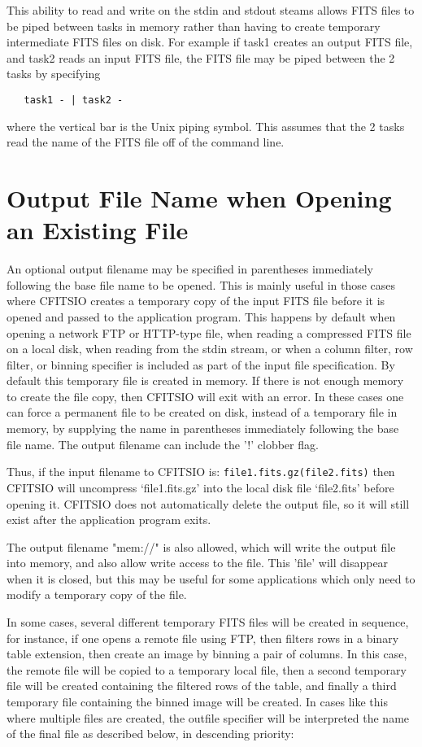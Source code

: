 \documentclass[11pt]{book}
\begin{document}
This ability to read and write on the stdin and stdout steams allows
FITS files to be piped between tasks in memory rather than having to
create temporary intermediate FITS files on disk.  For example if task1
creates an output FITS file, and task2 reads an input FITS file, the
FITS file may be piped between the 2 tasks by specifying

\begin{verbatim}
   task1 - | task2 -
\end{verbatim}
where the vertical bar is the Unix piping symbol.  This assumes that the 2
tasks read the name of the FITS file off of the command line.


\section{Output File Name when Opening an Existing File}

An optional output filename may be specified in parentheses immediately
following the base file name to be opened.  This is mainly useful in
those cases where CFITSIO creates a temporary copy of the input FITS
file before it is opened and passed to the application program.  This
happens by default when opening a network FTP or HTTP-type file, when
reading a compressed FITS file on a local disk, when reading from the
stdin stream, or when a column filter, row filter, or binning specifier
is included as part of the input file specification.  By default this
temporary file is created in memory.  If there is not enough memory to
create the file copy, then CFITSIO will exit with an error.   In these
cases one can force a permanent file to be created on disk, instead of
a temporary file in memory, by supplying the name in parentheses
immediately following the base file name.  The output filename can
include the '!' clobber flag.

Thus, if the input filename to CFITSIO is:
\verb+file1.fits.gz(file2.fits)+
then CFITSIO will uncompress `file1.fits.gz' into the local disk file
`file2.fits' before opening it.  CFITSIO does not automatically delete
the output file, so it will still exist after the application program
exits.

The output filename "mem://" is also allowed, which will write the
output file into memory, and also allow write access to the file.  This
'file' will disappear when it is closed, but this may be useful for
some applications which only need to modify a temporary copy of the file.

In some cases, several different temporary FITS files will be created
in sequence, for instance, if one opens a remote file using FTP, then
filters rows in a binary table extension, then create an image by
binning a pair of columns.  In this case, the remote file will be
copied to a temporary local file, then a second temporary file will be
created containing the filtered rows of the table, and finally a third
temporary file containing the binned image will be created.  In cases
like this where multiple files are created, the outfile specifier will
be interpreted the name of the final file as described below, in descending
priority:
\end{document}
